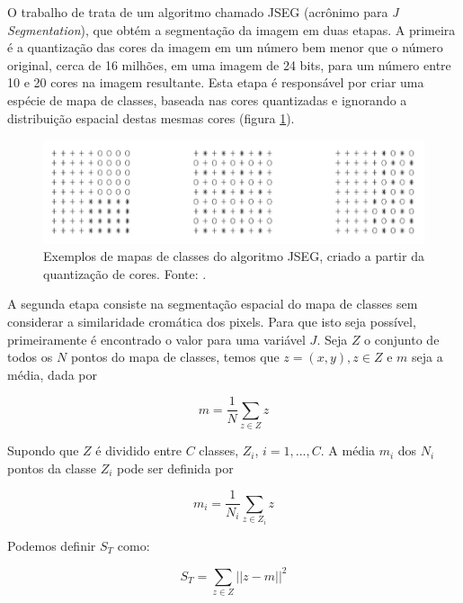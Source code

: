 
O trabalho de  trata de um algoritmo chamado JSEG (acrônimo para \textit{J Segmentation}), que obtém a segmentação da imagem em duas etapas. A primeira é a quantização das cores da imagem em um número bem menor que o número original, cerca de 16 milhões, em uma imagem de 24 bits, para um número entre 10 e 20 cores na imagem resultante. Esta etapa é responsável por criar uma espécie de mapa de classes, baseada nas cores quantizadas e ignorando a distribuição espacial destas mesmas cores (figura \ref{fig:jseg_classmap}).

\begin{figure}[h]
  \centering
  \includegraphics[scale=1]{imgs/jseg_classmap}
  \caption[Exemplos de mapas de classes do algoritmo JSEG]{Exemplos de mapas de classes do algoritmo JSEG, criado a partir da quantização de cores. Fonte: \cite{deng:2001}.}
  \label{fig:jseg_classmap}
\end{figure}

A segunda etapa consiste na segmentação espacial do mapa de classes sem considerar a similaridade cromática dos pixels. Para que isto seja possível, primeiramente é encontrado o valor para uma variável $J$. Seja $Z$ o conjunto de todos os $N$ pontos do mapa de classes, temos que $z = (x,y), z \in Z$ e $m$ seja a média, dada por

\begin{equation}
	\displaystyle m = \frac{1}{N} \sum_{z \in Z} z
\end{equation}

Supondo que $Z$ é dividido entre $C$ classes, $Z_i$, $i = 1,...,C$. A média $m_i$ dos $N_i$ pontos da classe $Z_i$ pode ser definida por

\begin{equation}
	\displaystyle m_i = \frac{1}{N_i} \sum_{z \in Z_i} z
\end{equation}

Podemos definir $S_T$ como:

\begin{equation}
	\displaystyle S_T = \sum_{z \in Z} || z - m ||^2
\end{equation}

